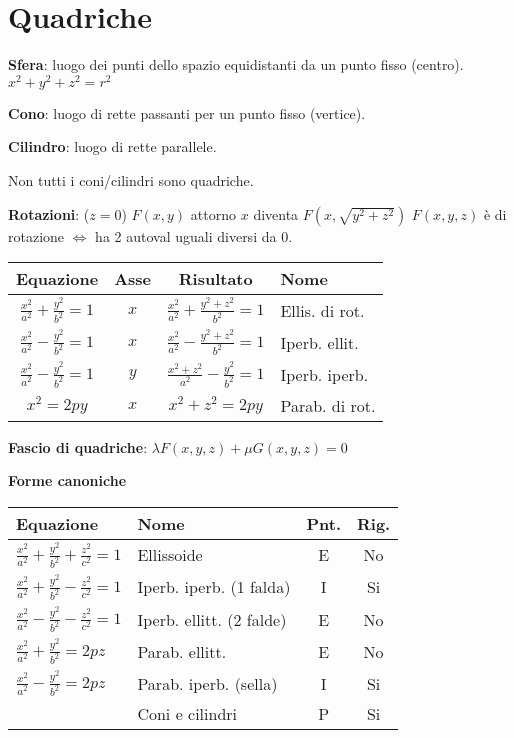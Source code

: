 \section{Quadriche}

\textbf{Sfera}: luogo dei punti dello spazio equidistanti da un punto fisso (centro). $x^2+y^2+z^2=r^2$

\textbf{Cono}: luogo di rette passanti per un punto fisso (vertice).

\textbf{Cilindro}: luogo di rette parallele.

Non tutti i coni/cilindri sono quadriche.

\textbf{Rotazioni}: ($z = 0$) $F(x, y)$ attorno $x$ diventa $F(x, \sqrt{y^2+z^2})$
$F(x,y,z)$ è di rotazione $\Leftrightarrow$ ha 2 autoval uguali diversi da 0.

\begin{tabular}{cccl}
	\textbf{Equazione} & \textbf{Asse} & \textbf{Risultato} & \textbf{Nome} \\
	\hline
	$\frac{x^2}{a^2}+\frac{y^2}{b^2}=1$ & $x$ & $\frac{x^2}{a^2}+\frac{y^2+z^2}{b^2}=1$ & Ellis. di rot. \\
	$\frac{x^2}{a^2}-\frac{y^2}{b^2}=1$ & $x$ & $\frac{x^2}{a^2}-\frac{y^2+z^2}{b^2}=1$ & Iperb. ellit. \\
	$\frac{x^2}{a^2}-\frac{y^2}{b^2}=1$ & $y$ & $\frac{x^2+z^2}{a^2}-\frac{y^2}{b^2}=1$ & Iperb. iperb. \\
	$x^2=2py$ & $x$ & $x^2+z^2=2py$ & Parab. di rot.
\end{tabular}

\textbf{Fascio di quadriche}: $\lambda F(x, y, z) + \mu G(x, y, z) = 0$

\textbf{Forme canoniche}
\begin{tabular}{llcc}
	\textbf{Equazione} & \textbf{Nome} & \textbf{Pnt.} & \textbf{Rig.} \\
	\hline
	$\frac{x^2}{a^2} + \frac{y^2}{b^2} + \frac{z^2}{c^2} = 1$ & Ellissoide & E & No \\
	$\frac{x^2}{a^2} + \frac{y^2}{b^2} - \frac{z^2}{c^2} = 1$ & Iperb. iperb. (1 falda) & I & Si \\
	$\frac{x^2}{a^2} - \frac{y^2}{b^2} - \frac{z^2}{c^2} = 1$ & Iperb. ellitt. (2 falde) & E & No \\
	$\frac{x^2}{a^2} + \frac{y^2}{b^2} = 2pz$ & Parab. ellitt. & E & No \\
	$\frac{x^2}{a^2} - \frac{y^2}{b^2} = 2pz$ & Parab. iperb. (sella) & I & Si \\
	 & Coni e cilindri & P & Si \\
\end{tabular}

